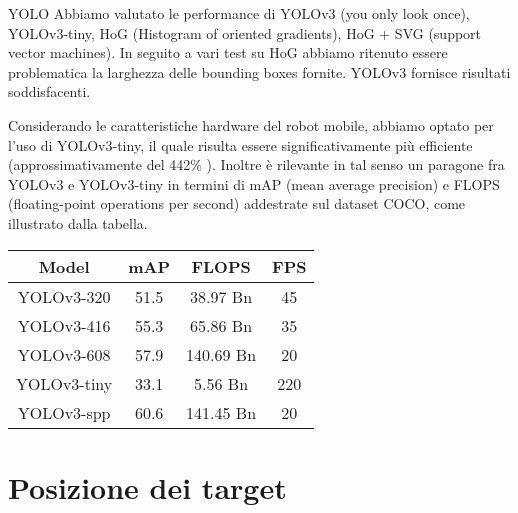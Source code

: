 \documentclass[10pt]{beamer}
\begin{document}
	\begin{frame}{YOLO}
		Abbiamo valutato le performance di
		YOLOv3 (you only look once), YOLOv3-tiny, HoG (Histogram of oriented
		gradients), HoG + SVG (support vector machines).  In seguito a vari test su HoG abbiamo ritenuto essere
		problematica la larghezza delle bounding boxes fornite. YOLOv3 fornisce risultati soddisfacenti.
		
		Considerando le caratteristiche hardware del robot mobile, abbiamo optato per l'uso di
		YOLOv3-tiny, il quale risulta essere significativamente più efficiente
		(approssimativamente del 442\% \cite{tiny_yolo}). Inoltre è rilevante in tal senso un paragone fra YOLOv3 e
		YOLOv3-tiny in termini di mAP (mean average precision) e FLOPS
		(floating-point operations per second) addestrate sul dataset COCO, come
		illustrato dalla tabella.
		
		\begin{table}[htpb]
			\centering
			\begin{tabular}{ |c|c|c|c| } 
				\hline
				Model & mAP & FLOPS & FPS \\
				\hline	
				 YOLOv3-320    & 51.5  &  38.97  Bn  &  45  \\ 
				 YOLOv3-416    & 55.3  &  65.86  Bn  &  35  \\ 
				 YOLOv3-608    & 57.9  &  140.69 Bn  &  20  \\ 
				 YOLOv3-tiny   & 33.1  &  5.56   Bn  &  220 \\
				 YOLOv3-spp    & 60.6  &  141.45 Bn  &  20  \\
				\hline
			\end{tabular}
			\label{tab:comparison}
		\end{table}
		
	\end{frame}

	\section{Posizione dei target}\label{sec:Posizione-dei-target}
	\frame{\sectionpage}
	
\end{document}
